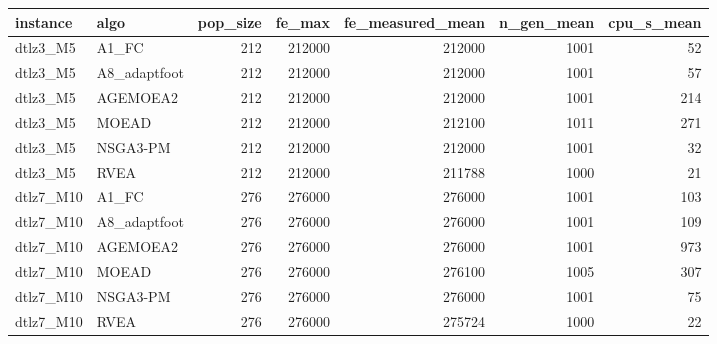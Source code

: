 \begin{tabular}{llrrrrr}
\toprule
instance & algo & pop_size & fe_max & fe_measured_mean & n_gen_mean & cpu_s_mean \\
\midrule
dtlz3_M5 & A1_FC & 212 & 212000 & 212000 & 1001 & 52 \\
dtlz3_M5 & A8_adaptfoot & 212 & 212000 & 212000 & 1001 & 57 \\
dtlz3_M5 & AGEMOEA2 & 212 & 212000 & 212000 & 1001 & 214 \\
dtlz3_M5 & MOEAD & 212 & 212000 & 212100 & 1011 & 271 \\
dtlz3_M5 & NSGA3-PM & 212 & 212000 & 212000 & 1001 & 32 \\
dtlz3_M5 & RVEA & 212 & 212000 & 211788 & 1000 & 21 \\
dtlz7_M10 & A1_FC & 276 & 276000 & 276000 & 1001 & 103 \\
dtlz7_M10 & A8_adaptfoot & 276 & 276000 & 276000 & 1001 & 109 \\
dtlz7_M10 & AGEMOEA2 & 276 & 276000 & 276000 & 1001 & 973 \\
dtlz7_M10 & MOEAD & 276 & 276000 & 276100 & 1005 & 307 \\
dtlz7_M10 & NSGA3-PM & 276 & 276000 & 276000 & 1001 & 75 \\
dtlz7_M10 & RVEA & 276 & 276000 & 275724 & 1000 & 22 \\
\bottomrule
\end{tabular}
